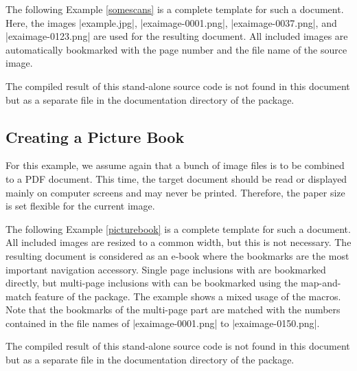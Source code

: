 \documentclass[a4paper,11pt]{ltxdoc}
\begin{document}
The following Example \ref{somescans} is a complete template for such a document.
Here, the images |example.jpg|,
|exaimage-0001.png|,
|exaimage-0037.png|, and
|exaimage-0123.png| are used for the resulting document.
All included images are automatically bookmarked with the page number and
the file name of the source image.




The compiled result of this stand-alone source code is not found in this document but as
a separate file in the documentation directory of the package.



\clearpage
\subsection{Creating a Picture Book}
For this example, we assume again that a bunch of image files is to be
combined to a PDF document. This time, the target document should be read or
displayed mainly on computer screens and may never be printed. Therefore,
the paper size is set flexible for the current image.

The following Example \ref{picturebook} is a complete template for such a document.
All included images are resized to a common width, but this is not necessary.
The resulting document is considered as an e-book where the bookmarks are the
most important navigation accessory.
Single page inclusions with  are bookmarked directly, but
multi-page inclusions with  can be bookmarked using the
map-and-match feature of the package.
The example shows a mixed usage of the macros.
Note that the bookmarks of the multi-page part are matched with the numbers
contained in the file names of |exaimage-0001.png| to |exaimage-0150.png|.




The compiled result of this stand-alone source code is not found in this document but as
a separate file in the documentation directory of the package.
\end{document}
